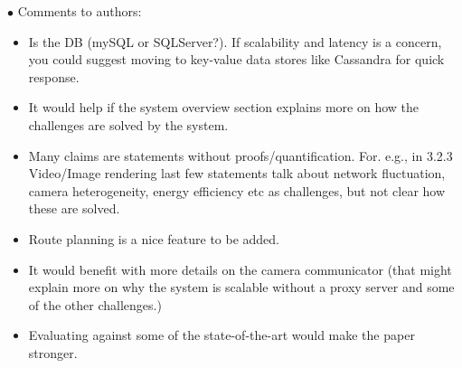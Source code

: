 \documentclass[a4paper, 12pt]{article}
\begin{document}
\begin{center}
\noindent$\bullet$ Comments to authors:
\begin{itemize}
\item Is the DB (mySQL or SQLServer?). If scalability and latency is a concern, you could suggest moving to key-value data stores like Cassandra for quick response.
\item It would help if the system overview section explains more on how the challenges are solved by the system. 
\item Many claims are statements without proofs/quantification.  For. e.g., in 3.2.3 Video/Image rendering last few statements talk about network fluctuation, camera heterogeneity, energy efficiency etc as challenges, but not clear how these are solved.
\item Route planning is a nice feature to be added.
\item It would benefit with more details on the camera communicator (that might explain more on why the system is scalable without a proxy server and some of the other challenges.)
\item Evaluating against some of the state-of-the-art would make the paper stronger. 
\end{itemize}
\end{center}
\end{document}
